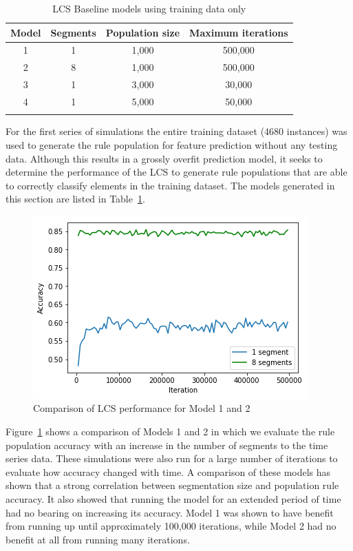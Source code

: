 \documentclass[11pt]{article}
\begin{document}
\begin{table}[!htbp]
	\centering
	\caption{LCS Baseline models using training data only}
	\label{lcs-bs-models-tr}
	\begin{tabularx}{0.7\textwidth}{cccc}
		\toprule
		\textbf{Model} & \textbf{Segments} & \textbf{Population size} & \textbf{Maximum iterations} \\ \midrule
		      1        &         1         & 1,000                    & 500,000                     \\
		      2        &         8         & 1,000                    & 500,000                     \\
		      3        &         1         & 3,000                    & 30,000                      \\
		      4        &         1         & 5,000                    & 50,000                      \\ \bottomrule
		               &                   &                          &
	\end{tabularx}
\end{table}


For the first series of simulations the entire training dataset (4680 instances) was used to generate the rule population for feature prediction without any testing data. Although this results in a grossly overfit prediction model, it seeks to determine the performance of the LCS to generate rule populations that are able to correctly classify elements in the training dataset. The models generated in this section are listed in Table~\ref{lcs-bs-models-tr}.

\begin{figure}[!htbp]
	\centering
	\includegraphics[width=0.5\linewidth]{figures/bs-plot-1.png}
	\caption{Comparison of LCS performance for Model 1 and 2}
	\label{fig:diffSegment}
\end{figure}

Figure~\ref{fig:diffSegment} shows a comparison of Models 1 and 2 in which we evaluate the rule population accuracy with an increase in the number of segments to the time series data. These simulations were also run for a large number of iterations to evaluate how accuracy changed with time. A comparison of these models has shown that a strong correlation between segmentation size and population rule accuracy. It also showed that running the model for an extended period of time had no bearing on increasing its accuracy. Model 1 was shown to have benefit from running up until approximately 100,000 iterations, while Model 2 had no benefit at all from running many iterations.
\end{document}
